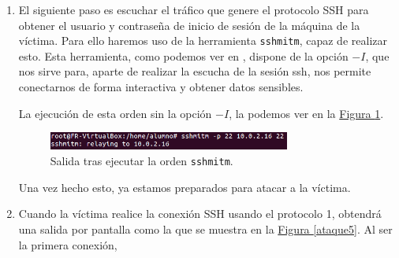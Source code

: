 \documentclass[10pt,a4paper,spanish]{article}
\begin{document}
\begin{enumerate}
    \item El siguiente paso es escuchar el tráfico que genere el protocolo SSH para obtener el usuario y contraseña de inicio de sesión de la máquina de la víctima. Para ello haremos uso de la herramienta \texttt{sshmitm}, capaz de realizar esto. Esta herramienta, como podemos ver en \cite{sshmitm}, dispone de la opción $-I$, que nos sirve para, aparte de realizar la escucha de la sesión ssh, nos permite conectarnos de forma interactiva y obtener datos sensibles.

    La ejecución de esta orden sin la opción $-I$, la podemos ver en la \hyperref[ataque4]{Figura \ref*{ataque4}}.

    \begin{figure}[!h]
        \centering
        \includegraphics[width=0.75\textwidth]{ataque4}
        \caption{Salida tras ejecutar la orden \texttt{sshmitm}.}
        \label{ataque4}
    \end{figure}

    Una vez hecho esto, ya estamos preparados para atacar a la víctima.

    \item Cuando la víctima realice la conexión SSH usando el protocolo 1, obtendrá una salida por pantalla como la que se muestra en la \hyperref[ataque5]{Figura \ref*{ataque5}}. Al ser la primera conexión, 

\end{enumerate}


 

\end{document}
